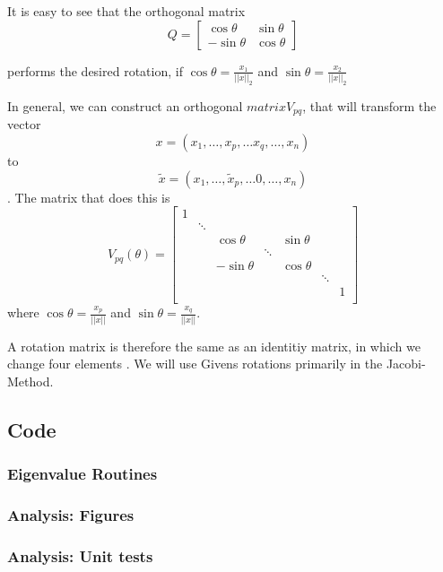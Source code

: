 \documentclass[12pt]{article}
\begin{document}
It is easy to see that the orthogonal matrix
$$Q=\begin{bmatrix}
\cos\theta & \sin\theta \\
-\sin\theta & \cos\theta
\end{bmatrix}$$

performs the desired rotation, if $\cos\theta = \frac{x_1}{||x||_2}$ and $\sin\theta = \frac{x_2}{||x||_2}$

In general, we can construct an orthogonal $matrix V_{pq}$, that will transform the vector $$x = (x_1,\dots, x_p, \dots x_q, \dots, x_n)$$ to $$\tilde{x} = (x_1,\dots, \tilde{x}_p, \dots 0, \dots, x_n)$$. The matrix that does this is
\scriptsize
\begin{equation}
\label{givens-rotation}
V_{pq}(\theta) = \begin{bmatrix}
                      1 \\
                        & \ddots \\
                        &        & \cos\theta    &        & \sin\theta  \\
                        &        &               & \ddots     \\
                        &        & -\sin\theta   &        & \cos\theta   \\
                        &        &               &        &            &  \ddots \\
                        &        &               &        &            &         & 1 \\
                 \end{bmatrix}
\end{equation}
\normalsize
	where $\cos\theta = \frac{x_p}{||x||}$ and $\sin\theta = \frac{x_q}{||x||}.$

A rotation matrix is therefore the same as an identitiy matrix, in which we change four elements \citep[p. 105]{NME}. We will use Givens rotations primarily in the Jacobi-Method.
\newpage
\subsection{Code}
\subsubsection{Eigenvalue Routines}
  
  
  \newpage
\subsubsection{Analysis: Figures}
  
  \newpage
\subsubsection{Analysis: Unit tests}
  
  \newpage


\end{document}
